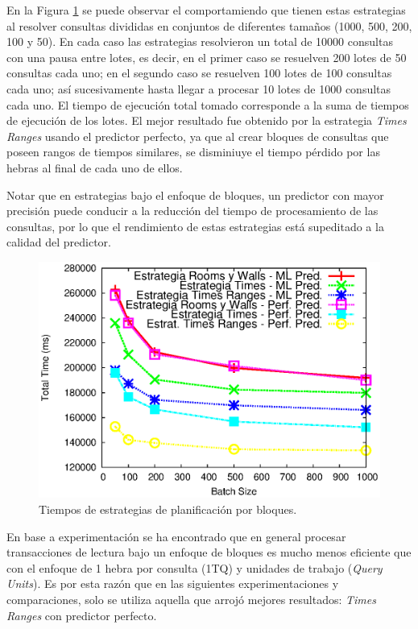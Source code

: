 En la Figura \ref{fig:scheduler_all_16threads} se puede observar el comportamiendo que tienen estas estrategias al resolver consultas divididas en conjuntos de diferentes tamaños (1000, 500, 200, 100 y 50). En cada caso las estrategias resolvieron un total de 10000 consultas con una pausa entre lotes, es decir, en el primer caso se resuelven 200 lotes de 50 consultas cada uno; en el segundo caso se resuelven 100 lotes de 100 consultas cada uno; así sucesivamente hasta llegar a procesar 10 lotes de 1000 consultas cada uno. El tiempo de ejecución total tomado corresponde a la suma de tiempos de ejecución de los lotes. El mejor resultado fue obtenido por la estrategia \textit{Times Ranges} usando el predictor perfecto, ya que al crear bloques de consultas que poseen rangos de tiempos similares, se disminiuye el tiempo pérdido por las hebras al final de cada uno de ellos.

Notar que en estrategias bajo el enfoque de bloques, un predictor con mayor precisión puede conducir a la reducción del tiempo de procesamiento de las consultas, por lo que el rendimiento de estas estrategias está supeditado a la calidad del predictor. 

\begin{figure}[tp]
\centering
\includegraphics[scale=.75]{images/scheduler_all_16threads.eps}
\caption{Tiempos de estrategias de planificación por bloques.}
\label{fig:scheduler_all_16threads}
\end{figure}

En base a experimentación se ha encontrado que en general procesar transacciones de lectura bajo un enfoque de bloques \citep{Ye:2007} es mucho menos eficiente que con el enfoque de 1 hebra por consulta (1TQ) y unidades de trabajo (\textit{Query Units}). Es por esta razón que en las siguientes experimentaciones y comparaciones, solo se utiliza aquella que arrojó mejores resultados: \textit{Times Ranges} con predictor perfecto.

